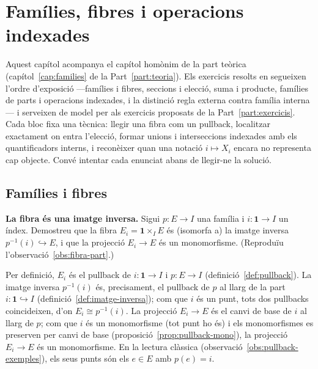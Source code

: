 \chapter{Famílies, fibres i operacions indexades}\label{cap:practica-families}

Aquest capítol acompanya el capítol homònim de la part teòrica (capítol~\ref{cap:families} de la Part~\ref{part:teoria}). Els exercicis resolts en segueixen l'ordre d'exposició ---famílies i fibres, seccions i elecció, suma i producte, famílies de parts i operacions indexades, i la distinció regla externa contra família interna--- i serveixen de model per als exercicis proposats de la Part~\ref{part:exercicis}. Cada bloc fixa una tècnica: llegir una fibra com un pullback, localitzar exactament on entra l'elecció, formar unions i interseccions indexades amb els quantificadors interns, i reconèixer quan una notació \(i\mapsto X_i\) encara no representa cap objecte. Convé intentar cada enunciat abans de llegir-ne la solució.

\section{Famílies i fibres}\label{prac:families-fibres}

\begin{exercici}
\textbf{La fibra és una imatge inversa.} Sigui \(p\colon E\to I\) una família i \(i\colon\mathbf1\to I\) un índex. Demostreu que la fibra \(E_i=\mathbf1\times_I E\) és (isomorfa a) la imatge inversa \(p^{-1}(i)\hookrightarrow E\), i que la projecció \(E_i\to E\) és un monomorfisme. (Reproduïu l'observació~\ref{obs:fibra-part}.)
\end{exercici}
\begin{solucio}
Per definició, \(E_i\) és el pullback de \(i\colon\mathbf1\to I\) i \(p\colon E\to I\) (definició~\ref{def:pullback}). La imatge inversa \(p^{-1}(i)\) és, precisament, el pullback de \(p\) al llarg de la part \(i\colon\mathbf1\hookrightarrow I\) (definició~\ref{def:imatge-inversa}); com que \(i\) és un punt, tots dos pullbacks coincideixen, d'on \(E_i\cong p^{-1}(i)\). La projecció \(E_i\to E\) és el canvi de base de \(i\) al llarg de \(p\); com que \(i\) és un monomorfisme (tot punt ho és) i els monomorfismes es preserven per canvi de base (proposició~\ref{prop:pullback-mono}), la projecció \(E_i\to E\) és un monomorfisme. En la lectura clàssica (observació~\ref{obs:pullback-exemples}), els seus punts són els \(e\in E\) amb \(p(e)=i\).
\end{solucio}

